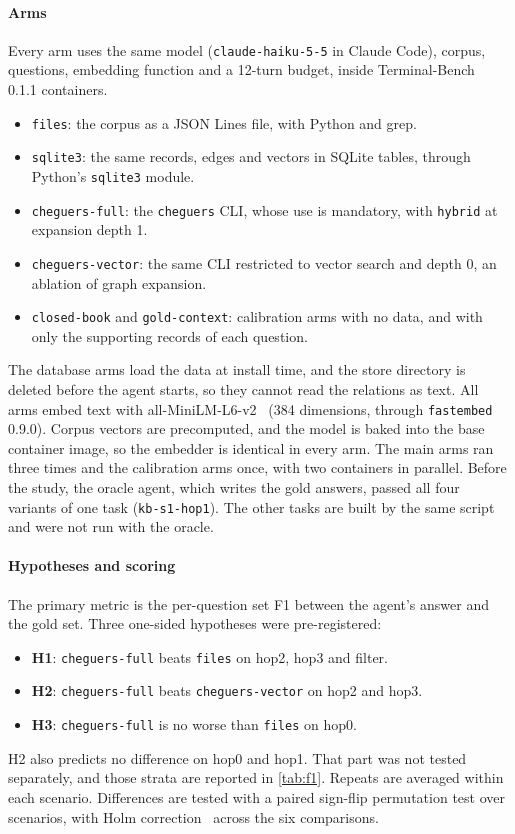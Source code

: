 \documentclass[preprint,12pt,a4paper]{elsarticle}
\newcommand{\code}[1]{\texttt{#1}}
\begin{document}
\paragraph{Arms} Every arm uses the same model (\code{claude-haiku-5-5} in Claude Code), corpus, questions, embedding function and a 12-turn budget, inside Terminal-Bench~\cite{merrill2026terminalbench} 0.1.1 containers.
\begin{itemize}
  \item \code{files}: the corpus as a JSON Lines file, with Python and grep.
  \item \code{sqlite3}: the same records, edges and vectors in SQLite tables, through Python's \code{sqlite3} module.
  \item \code{cheguers-full}: the \code{cheguers} CLI, whose use is mandatory, with \code{hybrid} at expansion depth 1.
  \item \code{cheguers-vector}: the same CLI restricted to vector search and depth 0, an ablation of graph expansion.
  \item \code{closed-book} and \code{gold-context}: calibration arms with no data, and with only the supporting records of each question.
\end{itemize}
The database arms load the data at install time, and the store directory is deleted before the agent starts, so they cannot read the relations as text. All arms embed text with all-MiniLM-L6-v2~\cite{reimers2019sbert} (384 dimensions, through \code{fastembed} 0.9.0). Corpus vectors are precomputed, and the model is baked into the base container image, so the embedder is identical in every arm. The main arms ran three times and the calibration arms once, with two containers in parallel. Before the study, the oracle agent, which writes the gold answers, passed all four variants of one task (\code{kb-s1-hop1}). The other tasks are built by the same script and were not run with the oracle.

\paragraph{Hypotheses and scoring} The primary metric is the per-question set F1 between the agent's answer and the gold set. Three one-sided hypotheses were pre-registered:
\begin{itemize}
  \item \textbf{H1}: \code{cheguers-full} beats \code{files} on hop2, hop3 and filter.
  \item \textbf{H2}: \code{cheguers-full} beats \code{cheguers-vector} on hop2 and hop3.
  \item \textbf{H3}: \code{cheguers-full} is no worse than \code{files} on hop0.
\end{itemize}
H2 also predicts no difference on hop0 and hop1. That part was not tested separately, and those strata are reported in \cref{tab:f1}. Repeats are averaged within each scenario. Differences are tested with a paired sign-flip permutation test over scenarios, with Holm correction~\cite{holm1979} across the six comparisons.
\end{document}
